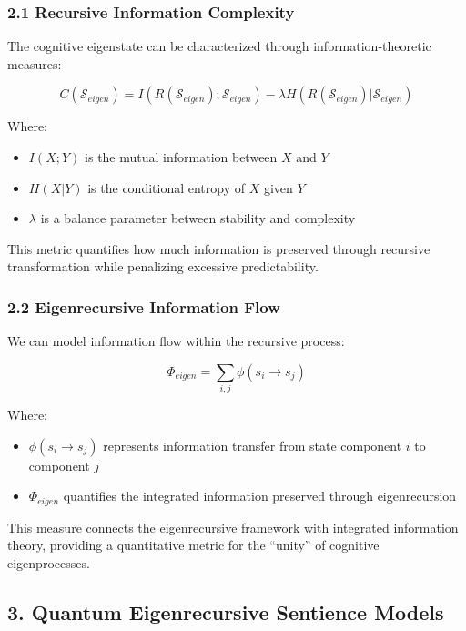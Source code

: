 \documentclass[
]{article}
\providecommand{\tightlist}{%
  \setlength{\itemsep}{0pt}\setlength{\parskip}{0pt}}
\begin{document}
\subsubsection{2.1 Recursive Information
Complexity}\label{recursive-information-complexity}

The cognitive eigenstate can be characterized through
information-theoretic measures:

\[C(\mathcal{S}_{eigen}) = I(R(\mathcal{S}_{eigen}); \mathcal{S}_{eigen}) - \lambda H(R(\mathcal{S}_{eigen})|\mathcal{S}_{eigen})\]

Where:

\begin{itemize}
\tightlist
\item
  \(I(X;Y)\) is the mutual information between \(X\) and \(Y\)
\item
  \(H(X|Y)\) is the conditional entropy of \(X\) given \(Y\)
\item
  \(\lambda\) is a balance parameter between stability and complexity
\end{itemize}

This metric quantifies how much information is preserved through
recursive transformation while penalizing excessive predictability.

\subsubsection{2.2 Eigenrecursive Information
Flow}\label{eigenrecursive-information-flow}

We can model information flow within the recursive process:

\[\Phi_{eigen} = \sum_{i,j} \phi(s_i \rightarrow s_j)\]

Where:

\begin{itemize}
\tightlist
\item
  \(\phi(s_i \rightarrow s_j)\) represents information transfer from
  state component \(i\) to component \(j\)
\item
  \(\Phi_{eigen}\) quantifies the integrated information preserved
  through eigenrecursion
\end{itemize}

This measure connects the eigenrecursive framework with integrated
information theory, providing a quantitative metric for the ``unity'' of
cognitive eigenprocesses.

\subsection{3. Quantum Eigenrecursive Sentience
Models}\label{quantum-eigenrecursive-sentience-models}
\end{document}
